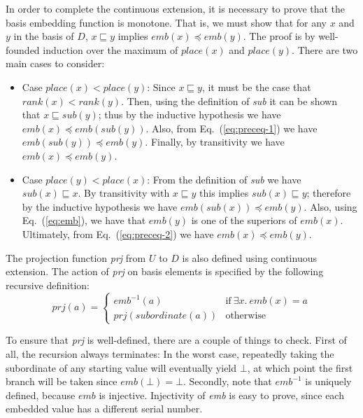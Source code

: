 \documentclass{llncs}
\begin{document}
In order to complete the continuous extension, it is necessary to prove
that the basis embedding function is monotone.  That is, we must show
that for any $x$ and $y$ in the basis of $D$, $x \sqsubseteq y$
implies $\mathit{emb}(x) \preceq \mathit{emb}(y)$.  The proof is by
well-founded induction over the maximum of $\mathit{place}(x)$ and
$\mathit{place}(y)$.  There are two main cases to consider:
\begin{itemize}
\item Case $\mathit{place}(x) < \mathit{place}(y)$: Since $x
  \sqsubseteq y$, it must be the case that $\mathit{rank}(x) <
  \mathit{rank}(y)$.  Then, using the definition of \emph{sub} it can
  be shown that $x \sqsubseteq \mathit{sub}(y)$; thus by the inductive
  hypothesis we have $\mathit{emb}(x) \preceq
  \mathit{emb}(\mathit{sub}(y))$.  Also, from Eq.~(\ref{eq:preceq-1})
  we have $\mathit{emb}(\mathit{sub}(y)) \preceq \mathit{emb}(y)$.
  Finally, by transitivity we have $\mathit{emb}(x) \preceq
  \mathit{emb}(y)$.

\item Case $\mathit{place}(y) < \mathit{place}(x)$: From the
  definition of \emph{sub} we have $\mathit{sub}(x) \sqsubseteq x$.
  By transitivity with $x \sqsubseteq y$ this implies $\mathit{sub}(x)
  \sqsubseteq y$; therefore by the inductive hypothesis we have
  $\mathit{emb}(\mathit{sub}(x)) \preceq \mathit{emb}(y)$.  Also,
  using Eq.~(\ref{eq:emb}), we have that $\mathit{emb}(y)$ is one of
  the superiors of $\mathit{emb}(x)$.  Ultimately, from
  Eq.~(\ref{eq:preceq-2}) we have $\mathit{emb}(x) \preceq
  \mathit{emb}(y)$.
\end{itemize}

The projection function \emph{prj} from $U$ to $D$ is also defined
using continuous extension.  The action of \emph{prj} on basis
elements is specified by the following recursive definition:
\begin{equation}
\mathit{prj}(a) =
\begin{cases}
\mathit{emb}^{-1}(a) & \mbox{if}~\exists x.~\mathit{emb}(x) = a \\
\mathit{prj}(\mathit{subordinate}(a)) & \mbox{otherwise}
\end{cases}
\label{eq:prj}
\end{equation}

To ensure that \emph{prj} is well-defined, there are a couple of
things to check.  First of all, the recursion always terminates: In
the worst case, repeatedly taking the subordinate of any starting
value will eventually yield $\bot$, at which point the first branch
will be taken since $\mathit{emb}(\bot) = \bot$.  Secondly, note that
$\mathit{emb}^{-1}$ is uniquely defined, because $\mathit{emb}$ is
injective.  Injectivity of \emph{emb} is easy to prove, since each
embedded value has a different serial number.
\end{document}
